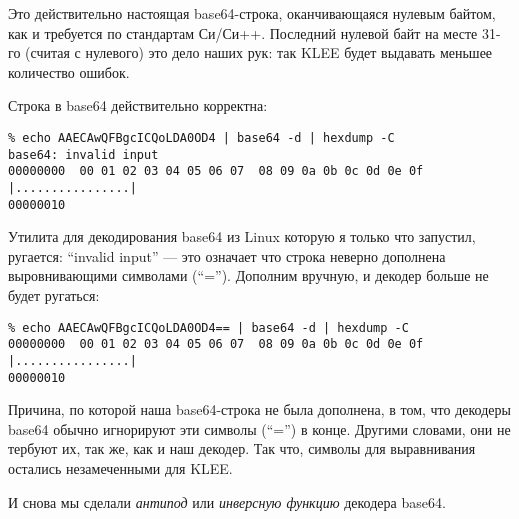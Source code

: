 Это действительно настоящая base64-строка, оканчивающаяся нулевым байтом, как и требуется по стандартам Си/Си++.
Последний нулевой байт на месте 31-го (считая с нулевого) это дело наших рук: так KLEE будет выдавать меньшее количество
ошибок.

Строка в base64 действительно корректна:

\begin{lstlisting}
% echo AAECAwQFBgcICQoLDA0OD4 | base64 -d | hexdump -C
base64: invalid input
00000000  00 01 02 03 04 05 06 07  08 09 0a 0b 0c 0d 0e 0f  |................|
00000010
\end{lstlisting}

Утилита для декодирования base64 из Linux которую я только что запустил, ругается: ``invalid input'' --- 
это означает что строка неверно дополнена выровнивающими символами (``='').
Дополним вручную, и декодер больше не будет ругаться:

\begin{lstlisting}
% echo AAECAwQFBgcICQoLDA0OD4== | base64 -d | hexdump -C
00000000  00 01 02 03 04 05 06 07  08 09 0a 0b 0c 0d 0e 0f  |................|
00000010
\end{lstlisting}

Причина, по которой наша base64-строка не была дополнена, в том, что декодеры base64 обычно игнорируют эти символы (``='')
в конце.
Другими словами, они не тербуют их, так же, как и наш декодер.
Так что, символы для выравнивания остались незамеченными для KLEE.

И снова мы сделали \textit{антипод} или \textit{инверсную функцию} декодера base64.

